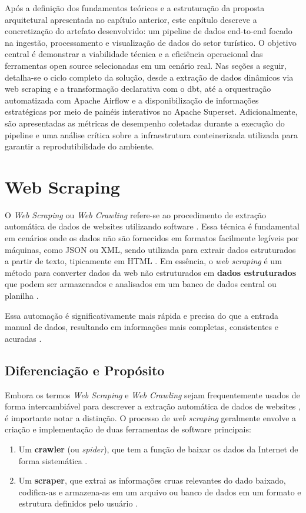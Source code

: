 Após a definição dos fundamentos teóricos e a estruturação da proposta arquitetural apresentada no capítulo anterior, este capítulo descreve a concretização do artefato desenvolvido: um pipeline de dados end-to-end focado na ingestão, processamento e visualização de dados do setor turístico. O objetivo central é demonstrar a viabilidade técnica e a eficiência operacional das ferramentas open source selecionadas em um cenário real. Nas seções a seguir, detalha-se o ciclo completo da solução, desde a extração de dados dinâmicos via web scraping e a transformação declarativa com o dbt, até a orquestração automatizada com Apache Airflow e a disponibilização de informações estratégicas por meio de painéis interativos no Apache Superset. Adicionalmente, são apresentadas as métricas de desempenho coletadas durante a execução do pipeline e uma análise crítica sobre a infraestrutura conteinerizada utilizada para garantir a reprodutibilidade do ambiente.

\section{Web Scraping}

O \textit{Web Scraping} ou \textit{Web Crawling} refere-se ao procedimento de extração automática de dados de websites utilizando software \cite[]{khder2021web}. Essa técnica é fundamental em cenários onde os dados não são fornecidos em formatos facilmente legíveis por máquinas, como JSON ou XML, sendo utilizada para extrair dados estruturados a partir de texto, tipicamente em HTML \cite[]{khder2021web}. Em essência, o \textit{web scraping} é um método para converter dados da web não estruturados em \textbf{dados estruturados} que podem ser armazenados e analisados em um banco de dados central ou planilha \cite[]{khder2021web, mbata2024survey}.

Essa automação é significativamente mais rápida e precisa do que a entrada manual de dados, resultando em informações mais completas, consistentes e acuradas \cite[]{khder2021web}.

\subsection{Diferenciação e Propósito}

Embora os termos \textit{Web Scraping} e \textit{Web Crawling} sejam frequentemente usados de forma intercambiável para descrever a extração automática de dados de websites \cite[]{khder2021web}, é importante notar a distinção. O processo de \textit{web scraping} geralmente envolve a criação e implementação de duas ferramentas de software principais:
\begin{enumerate}
    \item Um \textbf{crawler} (ou \textit{spider}), que tem a função de baixar os dados da Internet de forma sistemática \cite[]{khder2021web, heltweg2023systematic}.
    \item Um \textbf{scraper}, que extrai as informações cruas relevantes do dado baixado, codifica-as e armazena-as em um arquivo ou banco de dados em um formato e estrutura definidos pelo usuário \cite[]{khder2021web}.
\end{enumerate}

